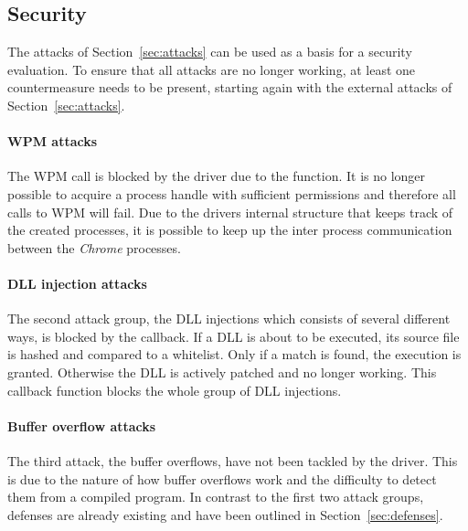 \subsection{Security}
\label{sec:security}
The attacks of Section~\ref{sec:attacks} can be used as a basis for a security evaluation. To ensure that all attacks are no longer working, at least one countermeasure needs to be present, starting again with the external attacks of Section~\ref{sec:attacks}. 

\paragraph{\gls{WPM} attacks}
The \gls{WPM} call is blocked by the driver due to the  function. It is no longer possible to acquire a process handle with sufficient permissions and therefore all calls to \gls{WPM} will fail. Due to the drivers internal structure that keeps track of the created processes, it is possible to keep up the inter process communication between the \emph{Chrome} processes. 

\paragraph{\gls{DLL} injection attacks}
The second attack group, the \gls{DLL} injections which consists of several different ways, is blocked by the  callback. If a \gls{DLL} is about to be executed, its source file is hashed and compared to a whitelist. Only if a match is found, the execution is granted. Otherwise the \gls{DLL} is actively patched and no longer working. This callback function blocks the whole group of \gls{DLL} injections.

\paragraph{Buffer overflow attacks}
The third attack, the buffer overflows, have not been tackled by the driver. This is due to the nature of how buffer overflows work and the difficulty to detect them from a compiled program. In contrast to the first two attack groups, defenses are already existing and have been outlined in Section~\ref{sec:defenses}.

